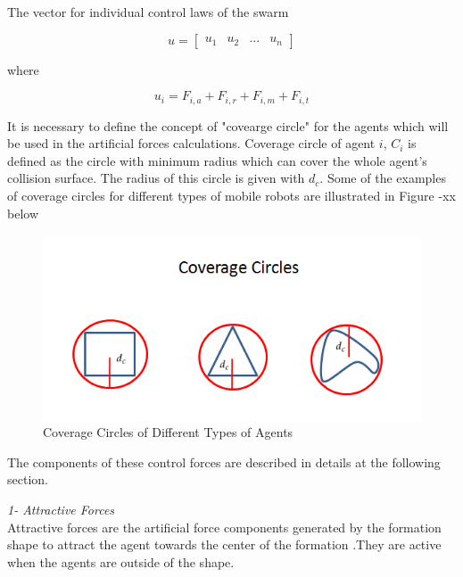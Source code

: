 The vector for individual control laws of the swarm

\begin{equation}
u = \begin{bmatrix}
u_1 & u_2 & ... & u_n
\end{bmatrix}
\end{equation}

where

\begin{equation}
u_i = F_{i,a} + F_{i,r} + F_{i,m} + F_{i,t}
\end{equation}

It is necessary to define the concept of "covearge circle"	for the agents which will be used in the artificial forces calculations. Coverage circle of agent $i$, $C_i$ is defined as the circle with minimum radius which can cover the whole agent's collision surface. The radius of this circle is given with $d_c$. Some of the examples of coverage circles for different types of mobile robots are illustrated in Figure -xx below
		
\begin{figure}[H]
\caption{Coverage Circles of Different Types of Agents}
\centering
\includegraphics[scale = 0.60]{coverage_circles}
\end{figure}
		
The components of these  control forces are described in details at the following section. \newline

\textit{			1- Attractive Forces} \\ 
Attractive forces are the artificial force components generated by the formation shape to attract the agent towards the center of the formation .They are active when the agents are outside of the shape. 

